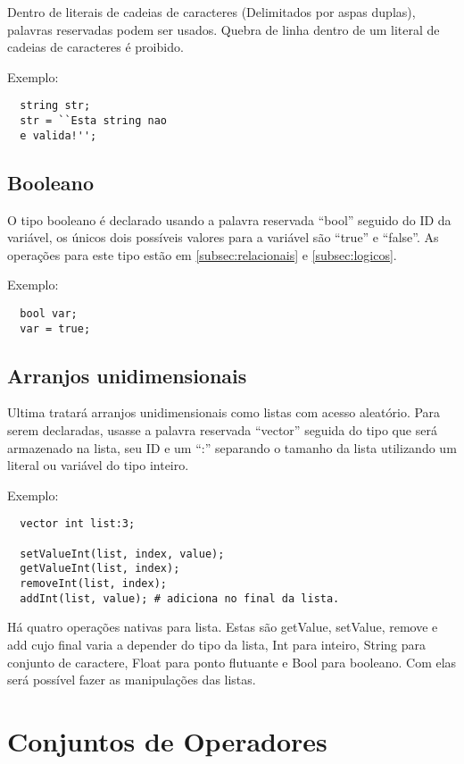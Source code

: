 \documentclass[a4paper, 11pt, article]{memoir}
\begin{document}
Dentro de literais de cadeias de caracteres (Delimitados por aspas duplas),
palavras reservadas podem ser usados. Quebra de linha dentro de um literal de
cadeias de caracteres é proibido.

Exemplo:
\begin{lstlisting}
  string str;
  str = ``Esta string nao
  e valida!'';
\end{lstlisting}

\subsection{Booleano}
\label{subsec:booleano}
O tipo booleano é declarado usando a palavra reservada ``bool'' seguido do ID da
variável, os únicos dois possíveis valores para a variável são ``true''
e ``false''. As operações para este tipo estão em \ref{subsec:relacionais} e
\ref{subsec:logicos}.

Exemplo:
\begin{lstlisting}
  bool var;
  var = true;
\end{lstlisting}

\subsection{Arranjos unidimensionais}
\label{subsec:array}
Ultima tratará arranjos unidimensionais como listas com acesso aleatório. Para
serem declaradas, usasse a palavra reservada ``vector'' seguida do tipo que será
armazenado na lista, seu ID e um ``:'' separando o tamanho da lista utilizando
um literal ou variável do tipo inteiro.

Exemplo:
\begin{lstlisting}
  vector int list:3;

  setValueInt(list, index, value);
  getValueInt(list, index);
  removeInt(list, index);
  addInt(list, value); # adiciona no final da lista.
\end{lstlisting}

Há quatro operações nativas para lista. Estas são getValue, setValue, remove e
add cujo final varia a depender do tipo da lista, Int para inteiro, String
para conjunto de caractere, Float para ponto flutuante e Bool para booleano. Com
elas será possível fazer as manipulações das listas.

\section{Conjuntos de Operadores}
\label{sec:operadores}
\end{document}
